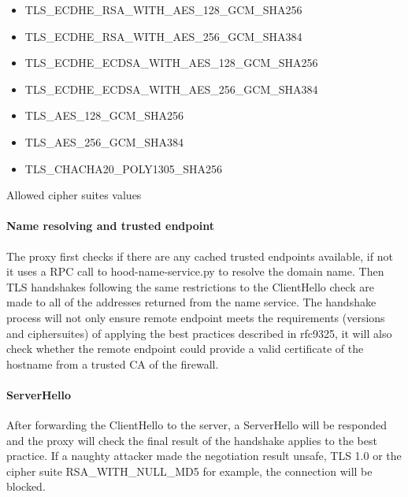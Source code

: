 \documentclass[mscthesis]{usiinfthesis}
\begin{document}
\begin{table}[H]
  \begin{itemize}
    \item TLS\_ECDHE\_RSA\_WITH\_AES\_128\_GCM\_SHA256
    \item TLS\_ECDHE\_RSA\_WITH\_AES\_256\_GCM\_SHA384
    \item TLS\_ECDHE\_ECDSA\_WITH\_AES\_128\_GCM\_SHA256
    \item TLS\_ECDHE\_ECDSA\_WITH\_AES\_256\_GCM\_SHA384
    \item TLS\_AES\_128\_GCM\_SHA256
    \item TLS\_AES\_256\_GCM\_SHA384
    \item TLS\_CHACHA20\_POLY1305\_SHA256
  \end{itemize}
  \caption{Allowed cipher suites values}
  \label{lst:tls-ciphersuites}
\end{table}

\paragraph{Name resolving and trusted endpoint}
The proxy first checks if there are any cached trusted endpoints available, if not it uses a RPC call to hood-name-service.py to resolve the domain name. Then TLS handshakes following the same restrictions to the ClientHello check are made to all of the addresses returned from the name service. The handshake process will not only ensure remote endpoint meets the requirements (versions and ciphersuites) of applying the best practices described in rfc9325, it will also check whether the remote endpoint could provide a valid certificate of the hostname from a trusted CA of the firewall.
\paragraph{ServerHello} After forwarding the ClientHello to the server, a ServerHello will be responded and the proxy will check the final result of the handshake applies to the best practice. If a naughty attacker made the negotiation result unsafe, TLS 1.0 or the cipher suite RSA\_WITH\_NULL\_MD5 for example, the connection will be blocked.
\end{document}
